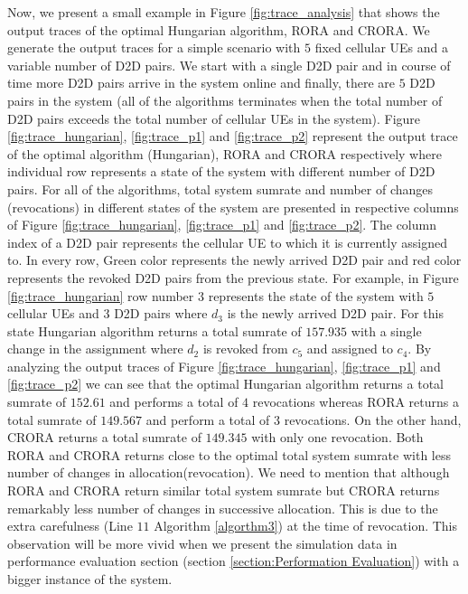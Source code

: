 \documentclass[times]{dacauth}
\begin{document}
\smallskip
\noindent
Now, we present a small example in Figure \ref{fig:trace_analysis} that shows the output traces of the optimal Hungarian algorithm, RORA and CRORA. We generate the output traces for a simple scenario with $5$ fixed cellular UEs and a variable number of D2D pairs. We start with a single D2D pair and in course of time more D2D pairs arrive in the system online and finally, there are $5$ D2D pairs in the system (all of the algorithms terminates when the total number of D2D pairs exceeds the total number of cellular UEs in the system). Figure \ref{fig:trace_hungarian}, \ref{fig:trace_p1} and  \ref{fig:trace_p2} represent the output trace of the optimal algorithm (Hungarian), RORA and CRORA respectively where individual row represents a state of the system with different number of D2D pairs. For all of the algorithms, total system sumrate and number of changes (revocations) in different states of the system are presented in respective columns of Figure \ref{fig:trace_hungarian}, \ref{fig:trace_p1} and  \ref{fig:trace_p2}. The column index of a D2D pair represents the cellular UE to which it is currently assigned to. In every row, Green color represents the newly arrived D2D pair and red color represents the revoked D2D pairs from the previous state. For example, in Figure \ref{fig:trace_hungarian} row number $3$ represents the state of the system with $5$ cellular UEs and $3$ D2D pairs where $d_3$ is the newly arrived D2D pair. For this state Hungarian algorithm returns a total sumrate of $157.935$ with a single change in the assignment where $d_2$ is revoked from $c_5$ and assigned to $c_4$. By analyzing the output traces of Figure \ref{fig:trace_hungarian}, \ref{fig:trace_p1} and  \ref{fig:trace_p2} we can see that the optimal Hungarian algorithm returns a total sumrate of $152.61$ and performs a total of $4$ revocations whereas RORA returns a total sumrate of $149.567$ and perform a total of $3$ revocations. On the other hand, CRORA returns a total sumrate of $149.345$ with only one revocation. Both RORA and CRORA returns close to the optimal total system sumrate  with less number of changes in allocation(revocation). We need to mention that although RORA and CRORA return similar total system sumrate but CRORA returns remarkably less number of changes in successive allocation. This is due to the extra carefulness (Line $11$ Algorithm \ref{algorthm3}) at the time of revocation. This observation will be more vivid when we present the simulation data in performance evaluation section (section \ref{section:Performation Evaluation}) with a bigger instance of the system. 
\end{document}
